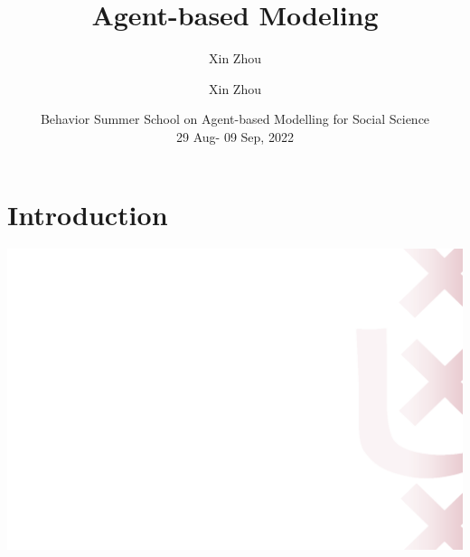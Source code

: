 \documentclass[compress]{beamer}
\title[Agent-based Modeling]{Agent-based Modeling}%
\subtitle{}%
\author[CCI]{Xin Zhou}
\institute[Informatics Institute]{University of Amsterdam}
\author[x.zhou@uva.nl]{Xin Zhou}%
\institute[Informatics Institute]{University of Amsterdam}
\date[\textcolor{white}{Behavior Summer School, 2022}]
{Behavior Summer School on Agent-based Modelling for Social Science\\
29 Aug- 09 Sep, 2022}
\begin{document}
\begingroup
    \begin{frame}
        \titlepage
    \end{frame}
\endgroup


\section{Introduction}
{
    \includegraphics[width=\paperwidth,height=\paperheight]{UvA-bg.png}
}
\end{document}

